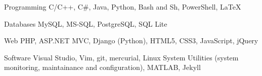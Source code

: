 
\begin{cvskills}

\cvskill
  {Programming} %
  {C/C++, C\#, Java, Python, Bash and Sh, PowerShell, LaTeX} %

\cvskill
  {Databases} %
  {MySQL, MS-SQL, PostgreSQL, SQL Lite} %

\cvskill
  {Web} %
  {PHP, ASP.NET MVC, Django (Python), HTML5, CSS3, JavaScript, jQuery} %

\cvskill
  {Software} %
  {Visual Studio, Vim, git, mercurial, Linux System Utilities (system
   monitoring, maintainance and configuration), MATLAB, Jekyll} %

\end{cvskills}
